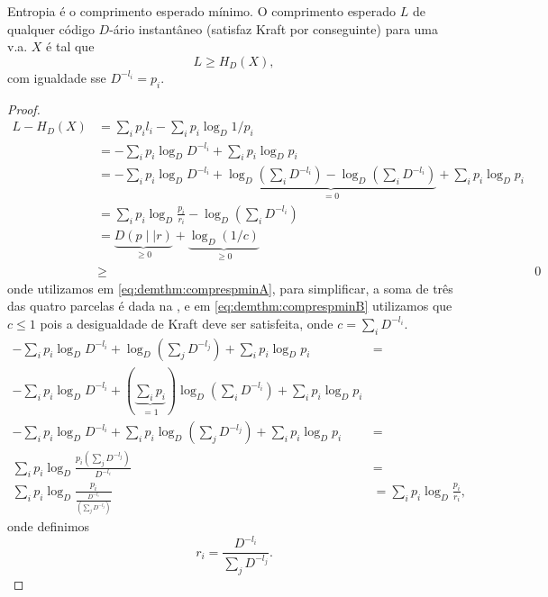 \begin{theorem}\label{thm:comprespmin}
Entropia é o comprimento esperado mínimo. O comprimento esperado $L$ de qualquer código
$D$-ário instantâneo (satisfaz Kraft por conseguinte) para uma v.a. $X$ é tal que
\begin{equation}
  L \geq H_D (X) ,
\end{equation}
com igualdade sse $D^{-l_i} = p_i$.
\end{theorem}
\begin{proof}
  \begin{subequations}
    \begin{align}
      L - H_D (X) &= \sum_i p_i l_i - \sum_i p_i \log_D 1/p_i \\
                &= - \sum_i p_i \log_D D^{-l_i} + \sum_i p_i \log_D p_i \\
                &= - \sum_i p_i \log_D D^{-l_i} + \underbrace{ \log_D \left( \sum_i D^{-l_i} \right) - \log_D \left( \sum_i D^{-l_i} \right)  }_{=0} + \sum_i p_i \log_D p_i \label{eq:demthm:comprespminA}\\
                &= \sum_i p_i \log_D \frac{p_i}{r_i} - \log_D \left( \sum_i D^{-l_i} \right) \\
                &= \underbrace{D(p \mid\mid r)}_{ \geq 0} + \underbrace{\log_D (1/c)}_{ \geq 0} \\
                &\geq& 0 \label{eq:demthm:comprespminB}
    \end{align}
  \end{subequations}
  onde utilizamos em \ref{eq:demthm:comprespminA}, para simplificar, a soma de três das quatro parcelas é dada na ,
  e em \ref{eq:demthm:comprespminB} utilizamos que $c \leq 1$ pois a desigualdade de Kraft deve ser satisfeita,
  onde $c = \sum_i D^{-l_i}$.
  \begin{subequations}\label{eq:demthm:simplificar}
    \begin{align}
      - \sum_i p_i \log_D D^{-l_i} + \log_D \left( \sum_j D^{-l_j} \right) +  \sum_i p_i \log_D p_i &= \\
      - \sum_i p_i \log_D D^{-l_i} + \left( \underbrace{ \sum_i p_i }_{=1} \right) \log_D \left( \sum_i D^{-l_i} \right) + \sum_i p_i \log_D p_i & \\  
      - \sum_i p_i \log_D D^{-l_i} + \sum_i p_i \log_D \left( \sum_j D^{-l_j} \right) + \sum_i p_i \log_D p_i &= \\
      \sum_i p_i \log_D \frac{p_i \left( \sum_j D^{-l_j} \right)}{D^{-l_i}} &= \\
      \sum_i p_i \log_D \frac{p_i}{\frac{D^{-l_i}}{\left( \sum_j D^{-l_j} \right)}} &= \sum_i p_i \log_D \frac{p_i}{r_i} ,
    \end{align}
  \end{subequations}
  onde definimos
  \begin{equation}
    r_i = \frac{D^{-l_i}}{\sum_j D^{-l_j}} .
  \end{equation}
\end{proof}

